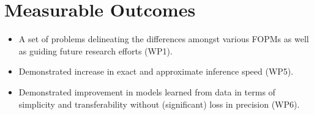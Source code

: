 \documentclass[11pt,english,twocolumn]{article}
\begin{document}

\section{Measurable Outcomes} %
\begin{itemize}
\item A set of problems delineating the differences amongst various
  FOPMs as well as guiding future research efforts (WP1).
\item Demonstrated increase in exact and approximate inference speed (WP5).
\item Demonstrated improvement in models learned from data in terms of
  simplicity and transferability without (significant) loss in precision (WP6).
\end{itemize}
\end{document}
